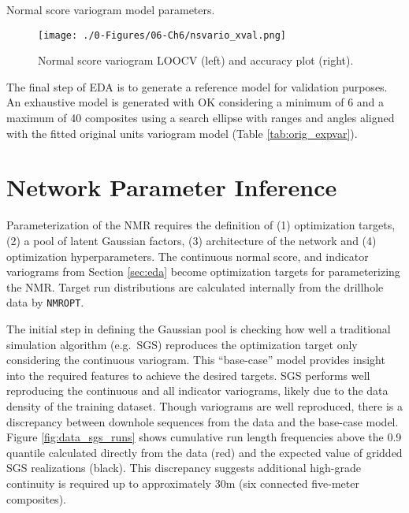 \begin{table}[!htb]
    \centering
    \caption{Normal score variogram model parameters.}
    \resizebox{1\width}{!}{}
    \label{tab:ns_expvar}
\end{table}

\begin{figure}[htb!]
    \centering
    \texttt{[image: ./0-Figures/06-Ch6/nsvario\_xval.png]}
    \caption{Normal score variogram \gls{LOOCV} (left) and accuracy plot (right).}
    \label{fig:ns_xval}
\end{figure}

The final step of \gls{EDA} is to generate a reference model for validation purposes. An exhaustive model is generated with \gls{OK} considering a minimum of 6 and a maximum of 40 composites using a search ellipse with ranges and angles aligned with the fitted original units variogram model (Table \ref{tab:orig_expvar}).

\FloatBarrier
\section{Network Parameter Inference}
\label{sec:param}

Parameterization of the \gls{NMR} requires the definition of (1) optimization targets, (2) a pool of latent Gaussian factors, (3) architecture of the network and (4) optimization hyperparameters. The continuous normal score, and indicator variograms from Section \ref{sec:eda} become optimization targets for parameterizing the \gls{NMR}. Target run distributions are calculated internally from the drillhole data by \texttt{NMROPT}.

The initial step in defining the Gaussian pool is checking how well a traditional simulation algorithm (e.g.\ \gls{SGS}) reproduces the optimization target only considering the continuous variogram. This ``base-case'' model provides insight into the required features to achieve the desired targets. \Gls{SGS} performs well reproducing the continuous and all indicator variograms, likely due to the data density of the training dataset. Though variograms are well reproduced, there is a discrepancy between downhole sequences from the data and the base-case model. Figure \ref{fig:data_sgs_runs} shows cumulative run length frequencies above the 0.9 quantile calculated directly from the data (red) and the expected value of gridded \gls{SGS} realizations (black). This discrepancy suggests additional high-grade continuity is required up to approximately 30m (six connected five-meter composites).

